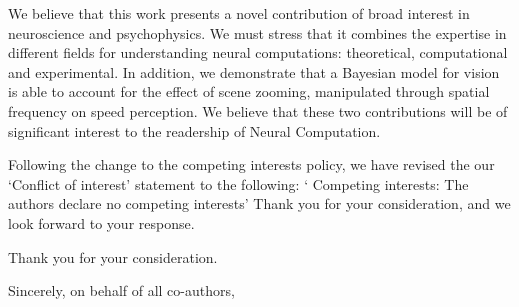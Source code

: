 \documentclass[stdletter,8pt,dateno]{newlfm}%
\newcommand{\Journal}{Neural Computation}%
\begin{document}
We believe that this work presents a novel contribution of broad interest in neuroscience and psychophysics. We must stress that it combines the expertise in different fields for understanding neural computations: theoretical, computational and experimental. In addition, we demonstrate that a Bayesian model for vision is able to account for the effect of scene zooming, manipulated through spatial frequency on speed perception. We believe that these two contributions will be of significant interest to the readership of \Journal.


Following the change to the competing interests policy, we have revised the our ‘Conflict of interest’ statement to the following: 
‘
Competing interests: The authors declare no competing interests’
Thank you for your consideration, and we look forward to your response. 


Thank you for your consideration.%


Sincerely, on behalf of all co-authors, 

\end{document}
